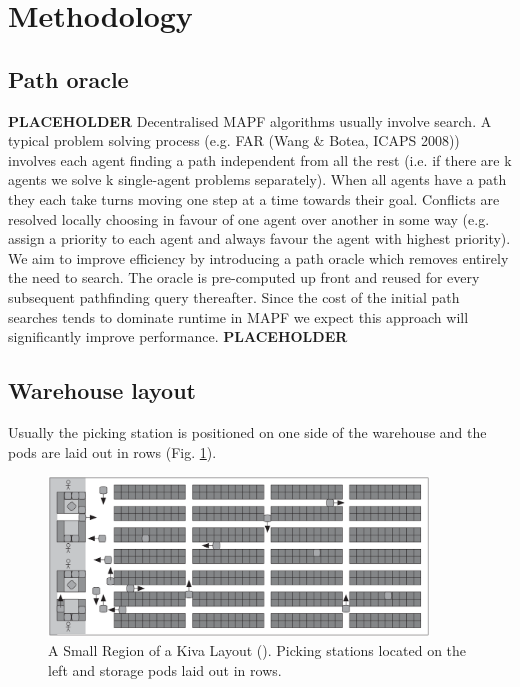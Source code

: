 \documentclass[a4paper,11pt]{article}
\begin{document}

\section{Methodology}
\label{Research}
\subsection{Path oracle}


\cite{strasser2015compressing}

\noindent \textbf{PLACEHOLDER} Decentralised MAPF algorithms usually involve search. A typical problem solving process (e.g. FAR (Wang \& Botea, ICAPS 2008)) involves each agent finding a path independent from all the rest (i.e. if there are k agents we solve k single-agent problems separately). When all agents have a path they each take turns moving one step at a time towards their goal. Conflicts are resolved locally choosing in favour of one agent over another in some way (e.g. assign a priority to each agent and always favour the agent with highest priority). We aim to improve efficiency by introducing a path oracle which removes entirely the need to search. The oracle is pre-computed up front and reused for every subsequent pathfinding query thereafter. Since the cost of the initial path searches tends to dominate runtime in MAPF we expect this approach will significantly improve performance. \textbf{PLACEHOLDER}

\subsection{Warehouse layout}
Usually the picking station is positioned on one side of the warehouse and the pods are laid out in rows (Fig. \ref{kivalayout1}).

\begin{figure}[h]
	\centering
	\includegraphics[width=0.9\textwidth]{graphics/kivasystemlayout}
	\caption{A Small Region of a Kiva Layout (\cite{wurman2008coordinating}). Picking stations located on the left and storage pods laid out in rows.}
	\label{kivalayout1}
\end{figure}
\end{document}
